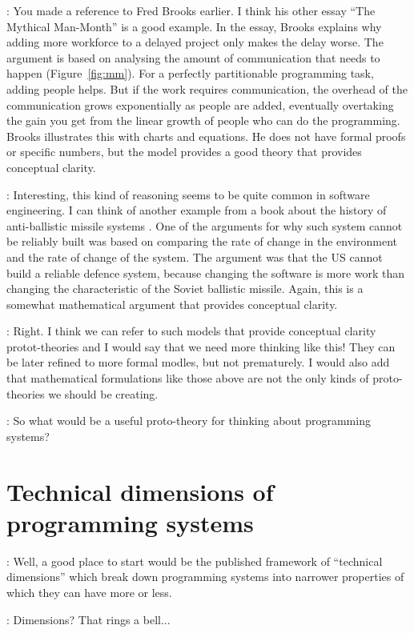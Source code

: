 \documentclass[runningheads]{llncs}
\newcommand{\T}{Tomas}
\newcommand{\J}{Joel}
\newcommand{\says}[2][gg]{\vspace{0.5em}\noindent\hangindent=0.5cm{\textsc{#1}}: #2}
\begin{document}
\says[\J]{You made a reference to Fred Brooks earlier. I think his other essay ``The Mythical Man-Month'' \cite{brooks-1975-manmonth} is a good example. In the essay, Brooks explains why adding more workforce to a delayed project only makes the delay worse. The argument is based on analysing the amount of communication that needs to happen (Figure~\ref{fig:mm}). For a perfectly partitionable programming task, adding people helps. But if the work requires communication, the overhead of the communication grows exponentially as people are added, eventually overtaking the gain you get from the linear growth of people who can do the programming. Brooks illustrates this with charts and equations. He does not have formal proofs or specific numbers, but the model provides a good theory that provides conceptual clarity.}

\says[\T]{Interesting, this kind of reasoning seems to be quite common in software engineering. I can think of another example from a book about the history of anti-ballistic missile systems \cite{slayton-2013-arguments}. One of the arguments for why such system cannot be reliably built was based on comparing the rate of change in the environment and the rate of change of the system. The argument was that the US cannot build a reliable defence system, because changing the software is more work than changing the characteristic of the Soviet ballistic missile. Again, this is a somewhat mathematical argument that provides conceptual clarity.}

\says[\J]{Right. I think we can refer to such models that provide conceptual clarity protot-theories and I would say that we need more thinking like this! They can be later refined to more formal modles, but not prematurely. I would also add that mathematical formulations like those above are not the only kinds of proto-theories we should be creating.}

\says[\T]{So what would be a useful proto-theory for thinking about programming systems?}
\section{Technical dimensions of programming systems}

\says[\J]{Well, a good place to start would be the published framework of ``technical dimensions'' which break down programming systems into narrower properties of which they can have more or less.}

\says[\T]{Dimensions? That rings a bell...}
\end{document}
